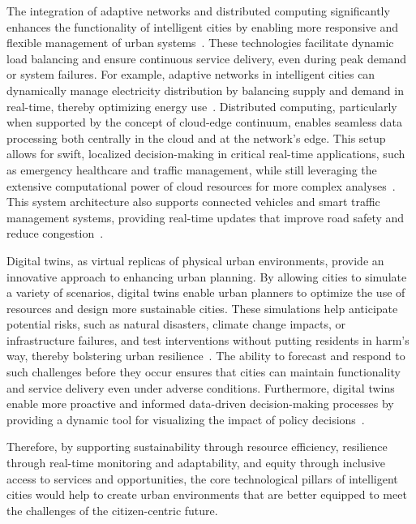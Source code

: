 \documentclass[smartcities,article,submit,pdftex,moreauthors]{Definitions/mdpi}
\begin{document}
The integration of adaptive networks and distributed computing significantly enhances the functionality of intelligent cities by enabling more responsive and flexible management of urban systems~\cite{javedFutureSmartCities2022}. These technologies facilitate dynamic load balancing and ensure continuous service delivery, even during peak demand or system failures. For example, adaptive networks in intelligent cities can dynamically manage electricity distribution by balancing supply and demand in real-time, thereby optimizing energy use~\cite{EnergyReconfigurableDistributionNetworks}. Distributed computing, particularly when supported by the concept of cloud-edge continuum, enables seamless data processing both centrally in the cloud and at the network's edge. This setup allows for swift, localized decision-making in critical real-time applications, such as emergency healthcare and traffic management, while still leveraging the extensive computational power of cloud resources for more complex analyses~\cite{EdgeCloudContinuum}. This system architecture also supports connected vehicles and smart traffic management systems, providing real-time updates that improve road safety and reduce congestion~\cite{barodiIntelligentTransportationSystem2023}.

Digital twins, as virtual replicas of physical urban environments, provide an innovative approach to enhancing urban planning. By allowing cities to simulate a variety of scenarios, digital twins enable urban planners to optimize the use of resources and design more sustainable cities. These simulations help anticipate potential risks, such as natural disasters, climate change impacts, or infrastructure failures, and test interventions without putting residents in harm's way, thereby bolstering urban resilience~\cite{UrbanDigitalTwinChallenges,DigitalTwinDisaster}. The ability to forecast and respond to such challenges before they occur ensures that cities can maintain functionality and service delivery even under adverse conditions. Furthermore, digital twins enable more proactive and informed data-driven decision-making processes by providing a dynamic tool for visualizing the impact of policy decisions~\cite{DigitalTwinsSurvey,TrendsDigitalTwinFrameworkArchitectures}.

Therefore, by supporting sustainability through resource efficiency, resilience through real-time monitoring and adaptability, and equity through inclusive access to services and opportunities, the core technological pillars of intelligent cities would help to create urban environments that are better equipped to meet the challenges of the citizen-centric future.
\end{document}
